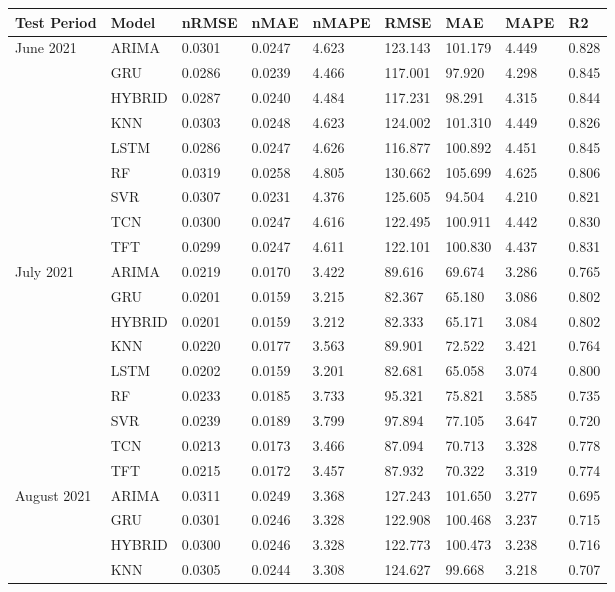 \begin{tabular}{lllllllll}
\toprule
Test Period & Model & nRMSE & nMAE & nMAPE & RMSE & MAE & MAPE & R2 \\
\midrule
June 2021 & ARIMA & 0.0301 & 0.0247 & 4.623 & 123.143 & 101.179 & 4.449 & 0.828 \\
 & GRU & 0.0286 & 0.0239 & 4.466 & 117.001 & 97.920 & 4.298 & 0.845 \\
 & HYBRID & 0.0287 & 0.0240 & 4.484 & 117.231 & 98.291 & 4.315 & 0.844 \\
 & KNN & 0.0303 & 0.0248 & 4.623 & 124.002 & 101.310 & 4.449 & 0.826 \\
 & LSTM & 0.0286 & 0.0247 & 4.626 & 116.877 & 100.892 & 4.451 & 0.845 \\
 & RF & 0.0319 & 0.0258 & 4.805 & 130.662 & 105.699 & 4.625 & 0.806 \\
 & SVR & 0.0307 & 0.0231 & 4.376 & 125.605 & 94.504 & 4.210 & 0.821 \\
 & TCN & 0.0300 & 0.0247 & 4.616 & 122.495 & 100.911 & 4.442 & 0.830 \\
 & TFT & 0.0299 & 0.0247 & 4.611 & 122.101 & 100.830 & 4.437 & 0.831 \\
July 2021 & ARIMA & 0.0219 & 0.0170 & 3.422 & 89.616 & 69.674 & 3.286 & 0.765 \\
 & GRU & 0.0201 & 0.0159 & 3.215 & 82.367 & 65.180 & 3.086 & 0.802 \\
 & HYBRID & 0.0201 & 0.0159 & 3.212 & 82.333 & 65.171 & 3.084 & 0.802 \\
 & KNN & 0.0220 & 0.0177 & 3.563 & 89.901 & 72.522 & 3.421 & 0.764 \\
 & LSTM & 0.0202 & 0.0159 & 3.201 & 82.681 & 65.058 & 3.074 & 0.800 \\
 & RF & 0.0233 & 0.0185 & 3.733 & 95.321 & 75.821 & 3.585 & 0.735 \\
 & SVR & 0.0239 & 0.0189 & 3.799 & 97.894 & 77.105 & 3.647 & 0.720 \\
 & TCN & 0.0213 & 0.0173 & 3.466 & 87.094 & 70.713 & 3.328 & 0.778 \\
 & TFT & 0.0215 & 0.0172 & 3.457 & 87.932 & 70.322 & 3.319 & 0.774 \\
August 2021 & ARIMA & 0.0311 & 0.0249 & 3.368 & 127.243 & 101.650 & 3.277 & 0.695 \\
 & GRU & 0.0301 & 0.0246 & 3.328 & 122.908 & 100.468 & 3.237 & 0.715 \\
 & HYBRID & 0.0300 & 0.0246 & 3.328 & 122.773 & 100.473 & 3.238 & 0.716 \\
 & KNN & 0.0305 & 0.0244 & 3.308 & 124.627 & 99.668 & 3.218 & 0.707 \\

\end{tabular}
